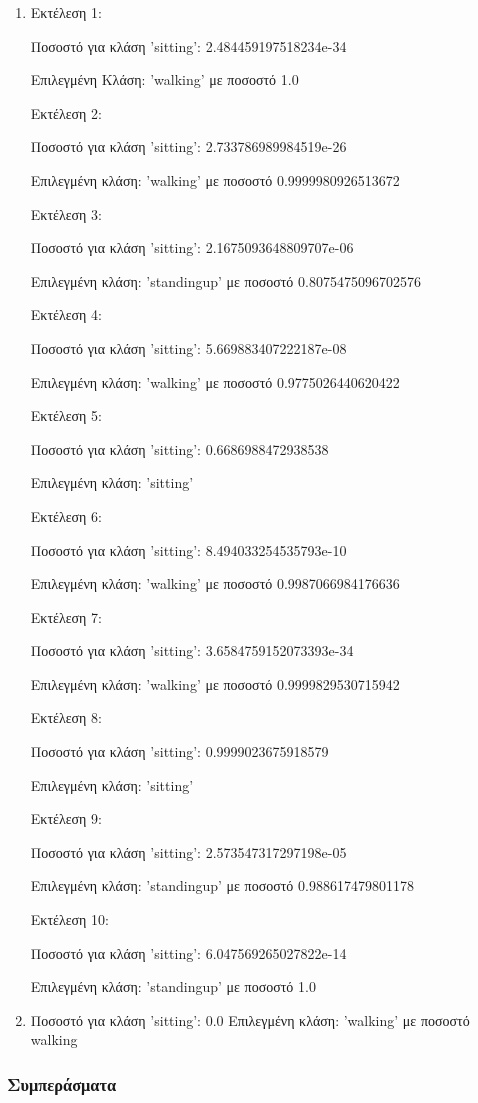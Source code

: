 \documentclass[12pt,a4paper]{article}
\begin{document}
\begin{enumerate}
    \item Εκτέλεση 1:
        
        Ποσοστό για κλάση 'sitting': 2.484459197518234e-34

        Επιλεγμένη Κλάση: 'walking' με ποσοστό 1.0

        Εκτέλεση 2:

        Ποσοστό για κλάση 'sitting': 2.733786989984519e-26

        Επιλεγμένη κλάση: 'walking' με ποσοστό 0.9999980926513672

        Εκτέλεση 3:

        Ποσοστό για κλάση 'sitting': 2.1675093648809707e-06
 
        Επιλεγμένη κλάση: 'standingup' με ποσοστό 0.8075475096702576

        Εκτέλεση 4:

        Ποσοστό για κλάση 'sitting': 5.669883407222187e-08

        Επιλεγμένη κλάση: 'walking' με ποσοστό 0.9775026440620422

        Εκτέλεση 5:

        Ποσοστό για κλάση 'sitting': 0.6686988472938538

        Επιλεγμένη κλάση: 'sitting'

        Εκτέλεση 6:

        Ποσοστό για κλάση 'sitting': 8.494033254535793e-10

        Επιλεγμένη κλάση: 'walking' με ποσοστό 0.9987066984176636

        Εκτέλεση 7:

        Ποσοστό για κλάση 'sitting': 3.6584759152073393e-34

        Επιλεγμένη κλάση: 'walking' με ποσοστό 0.9999829530715942

        Εκτέλεση 8:

        Ποσοστό για κλάση 'sitting': 0.9999023675918579

        Επιλεγμένη κλάση: 'sitting'

        Εκτέλεση 9:

        Ποσοστό για κλάση 'sitting': 2.573547317297198e-05

        Επιλεγμένη κλάση: 'standingup' με ποσοστό 0.988617479801178

        Εκτέλεση 10:

        Ποσοστό για κλάση 'sitting': 6.047569265027822e-14

        Επιλεγμένη κλάση: 'standingup' με ποσοστό 1.0

    \item 
        Ποσοστό για κλάση 'sitting': 0.0
        Επιλεγμένη κλάση: 'walking' με ποσοστό walking
\end{enumerate}

\subsubsection{Συμπεράσματα}
\end{document}
